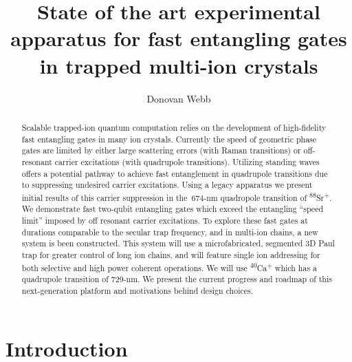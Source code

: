 \documentclass[12pt]{iopart}
\begin{document}
\title[]{State of the art experimental apparatus for fast entangling gates in trapped multi-ion crystals}

\author{Donovan Webb}

\address{Department of Physics,
University of Oxford}

\begin{abstract}

    Scalable trapped-ion quantum computation relies on the development
    of high-fidelity fast entangling gates in many ion crystals.
    Currently the speed of geometric phase gates are limited by either large
    scattering errors (with Raman transitions) or off-resonant carrier
    excitations (with quadrupole transitions).
    Utilizing standing waves offers a potential pathway to achieve
    fast entanglement in quadrupole transitions due to suppressing
    undesired carrier excitations.
    Using a legacy apparatus we present initial results of this
    carrier suppression in the~$674$-nm quadropole transition of
    \textsuperscript{88}Sr\textsuperscript{+}. We demonstrate
    fast two-qubit entangling gates which exceed the entangling ``speed
    limit'' imposed by off resonant carrier excitations.
    To explore these fast gates at durations comparable to the secular
    trap frequency, and in multi-ion chains, a new system is been
    constructed. This system will use a microfabricated, segmented 3D
    Paul trap for greater control of long ion chains, and will feature
    single ion addressing for both selective and high power coherent
    operations. We will use \textsuperscript{40}Ca\textsuperscript{+}
    which has a quadrupole transition of $729$-nm. We present the
    current progress and roadmap of this next-generation platform and
    motivations behind design choices.

\end{abstract}

\section{Introduction}
\end{document}
